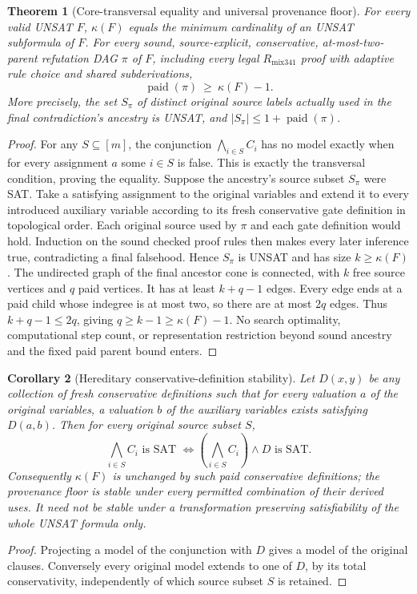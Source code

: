 \documentclass[11pt]{article}
\newtheorem{theorem}{Theorem}
\newtheorem{corollary}[theorem]{Corollary}
\begin{document}
\begin{theorem}[Core-transversal equality and universal provenance floor]
For every valid UNSAT $F$, $\kappa(F)$ equals the minimum cardinality of an UNSAT subformula of $F$. For \emph{every} sound, source-explicit, conservative, at-most-two-parent refutation DAG $\pi$ of $F$, including every legal $R_{\mathrm{mix341}}$ proof with adaptive rule choice and shared subderivations,
\[
       \operatorname{paid}(\pi)\ \ge\ \kappa(F)-1 .
\]
More precisely, the set $S_\pi$ of distinct original source labels actually used in the final contradiction's ancestry is UNSAT, and
$|S_\pi|\le 1+\operatorname{paid}(\pi)$.
\end{theorem}
\begin{proof}
For any $S\subseteq[m]$, the conjunction $\bigwedge_{i\in S}C_i$ has no model exactly when for every assignment $a$ some $i\in S$ is false. This is exactly the transversal condition, proving the equality. Suppose the ancestry's source subset $S_\pi$ were SAT. Take a satisfying assignment to the original variables and extend it to every introduced auxiliary variable according to its fresh conservative gate definition in topological order. Each original source used by $\pi$ and each gate definition would hold. Induction on the sound checked proof rules then makes every later inference true, contradicting a final falsehood. Hence $S_\pi$ is UNSAT and has size $k\ge\kappa(F)$. The undirected graph of the final ancestor cone is connected, with $k$ free source vertices and $q$ paid vertices. It has at least $k+q-1$ edges. Every edge ends at a paid child whose indegree is at most two, so there are at most $2q$ edges. Thus $k+q-1\le 2q$, giving $q\ge k-1\ge\kappa(F)-1$. No search optimality, computational step count, or representation restriction beyond sound ancestry and the fixed paid parent bound enters.
\end{proof}

\begin{corollary}[Hereditary conservative-definition stability]
Let $D(x,y)$ be any collection of fresh conservative definitions such that for \emph{every} valuation $a$ of the original variables, a valuation $b$ of the auxiliary variables exists satisfying $D(a,b)$. Then for \emph{every} original source subset $S$,
\[
   \bigwedge_{i\in S}C_i \text{ is SAT }
   \iff (\bigwedge_{i\in S}C_i)\land D \text{ is SAT}.
\]
Consequently $\kappa(F)$ is unchanged by such paid conservative definitions; the provenance floor is stable under every permitted combination of their derived uses. It need not be stable under a transformation preserving satisfiability of the \emph{whole UNSAT} formula only.
\end{corollary}
\begin{proof}
Projecting a model of the conjunction with $D$ gives a model of the original clauses. Conversely every original model extends to one of $D$, by its total conservativity, independently of which source subset $S$ is retained.
\end{proof}
\end{document}
